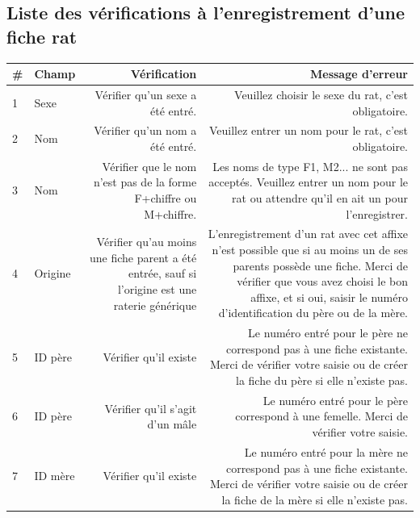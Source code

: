 \documentclass[a4paper,10pt]{article}
\begin{document}

\subsection{Liste des vérifications à l'enregistrement d'une fiche rat}
\label{app:verifs}
\small
\noindent\begin{tabularx}{\textwidth}{|l|l|R|R|}\hline
\textbf{\#} & \textbf{Champ} & \textbf{Vérification} & \textbf{Message d'erreur}\\\hline

1 & Sexe & Vérifier qu'un sexe a été entré. & Veuillez choisir le sexe du rat, c'est obligatoire. \\\hline

2 & Nom & Vérifier qu'un nom a été entré. &Veuillez entrer un nom pour le rat, c'est obligatoire. \\\hline

3 & Nom & Vérifier que le nom n'est pas de la forme F+chiffre ou M+chiffre. & Les noms de type F1, M2... ne sont pas acceptés. Veuillez entrer un nom pour le rat ou attendre qu'il en ait un pour l'enregistrer. \\\hline

4 & Origine & Vérifier qu'au moins une fiche parent a été entrée, sauf si l'origine est une raterie générique & L'enregistrement d'un rat avec cet affixe n'est possible que si au moins un de ses parents possède une fiche. Merci de vérifier que vous avez choisi le bon affixe, et si oui, saisir le numéro d'identification du père ou de la mère. \\\hline

5 & ID père & Vérifier qu'il existe & Le numéro entré pour le père ne correspond pas à une fiche existante. Merci de vérifier votre saisie ou de créer la fiche du père si elle n'existe pas. \\\hline


6 & ID père & Vérifier qu'il s'agit d'un mâle & Le numéro entré pour le père correspond à une femelle. Merci de vérifier votre saisie.\\\hline


7 & ID mère & Vérifier qu'il existe & Le numéro entré pour la mère ne correspond pas à une fiche existante. Merci de vérifier votre saisie ou de créer la fiche de la mère si elle n'existe pas.\\\hline



\end{tabularx}
\end{document}
